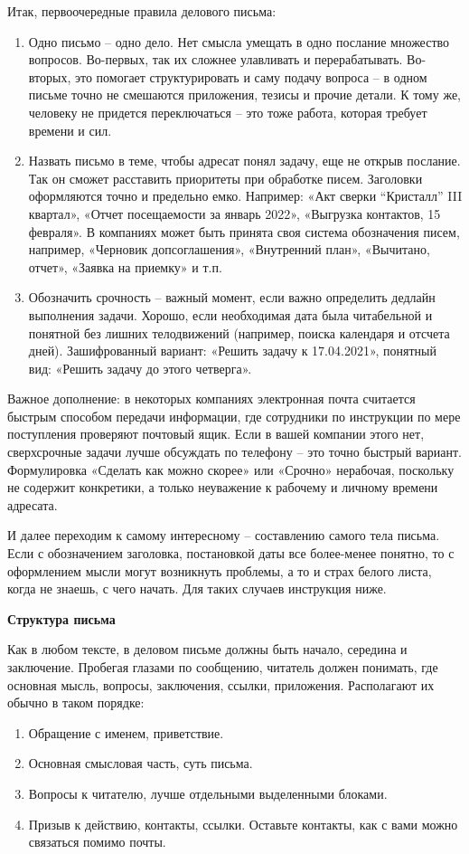 Итак, первоочередные правила делового письма:
\begin{enumerate}
    \item Одно письмо – одно дело. Нет смысла умещать в одно послание множество вопросов. Во-первых, так их сложнее улавливать и перерабатывать. Во-вторых, это помогает структурировать и саму подачу вопроса – в одном письме точно не смешаются приложения, тезисы и прочие детали. К тому же, человеку не придется переключаться – это тоже работа, которая требует времени и сил.
    \item Назвать письмо в теме, чтобы адресат понял задачу, еще не открыв послание. Так он сможет расставить приоритеты при обработке писем. Заголовки оформляются точно и предельно емко. Например: «Акт сверки “Кристалл” III квартал», «Отчет посещаемости за январь 2022», «Выгрузка контактов, 15 февраля». В компаниях может быть принята своя система обозначения писем, например, «Черновик допсоглашения», «Внутренний план», «Вычитано, отчет», «Заявка на приемку» и т.п.
    \item Обозначить срочность – важный момент, если важно определить дедлайн выполнения задачи. Хорошо, если необходимая дата была читабельной и понятной без лишних телодвижений (например, поиска календаря и отсчета дней). Зашифрованный вариант: «Решить задачу к 17.04.2021», понятный вид: «Решить задачу до этого четверга».
\end{enumerate}

Важное дополнение: в некоторых компаниях электронная почта считается быстрым способом передачи информации, где сотрудники по инструкции по мере поступления проверяют почтовый ящик. Если в вашей компании этого нет, сверхсрочные задачи лучше обсуждать по телефону – это точно быстрый вариант. Формулировка «Сделать как можно скорее» или «Срочно» нерабочая, поскольку не содержит конкретики, а только неуважение к рабочему и личному времени адресата.

И далее переходим к самому интересному – составлению самого тела письма. Если с обозначением заголовка, постановкой даты все более-менее понятно, то с оформлением мысли могут возникнуть проблемы, а то и страх белого листа, когда не знаешь, с чего начать. Для таких случаев инструкция ниже.


\textbf{Структура письма}

Как в любом тексте, в деловом письме должны быть начало, середина и заключение. Пробегая глазами по сообщению, читатель должен понимать, где основная мысль, вопросы, заключения, ссылки, приложения. Располагают их обычно в таком порядке:
\begin{enumerate}
    \item Обращение с именем, приветствие.
    \item Основная смысловая часть, суть письма.
    \item Вопросы к читателю, лучше отдельными выделенными блоками.
    \item Призыв к действию, контакты, ссылки. Оставьте контакты, как с вами можно связаться помимо почты.
\end{enumerate}

